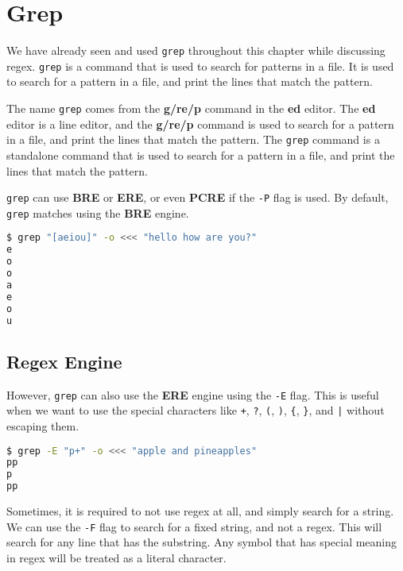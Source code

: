 \setchapterpreamble[u]{\margintoc}
\chapter{Grep}

We have already seen and used \lstinline|grep| throughout this chapter while discussing regex. \lstinline|grep| is a command that is used to search for patterns in a file. It is used to search for a pattern in a file, and print the lines that match the pattern.

The name \lstinline|grep| comes from the \textbf{g/re/p} command in the \textbf{ed} editor. The \textbf{ed} editor is a line editor, and the \textbf{g/re/p} command is used to search for a pattern in a file, and print the lines that match the pattern. The \lstinline|grep| command is a standalone command that is used to search for a pattern in a file, and print the lines that match the pattern.

\lstinline|grep| can use \textbf{BRE} or \textbf{ERE}, or even \textbf{PCRE} if the \lstinline|-P| flag is used. By default, \lstinline|grep| matches using the \textbf{BRE} engine.

\begin{lstlisting}[language=bash]
$ grep "[aeiou]" -o <<< "hello how are you?"
e
o
o
a
e
o
u
\end{lstlisting}

\section{Regex Engine}

However, \lstinline|grep| can also use the \textbf{ERE} engine using the \lstinline|-E| flag. This is useful when we want to use the special characters like \lstinline|+|, \lstinline|?|, \lstinline|(|, \lstinline|)|, \lstinline|{|, \lstinline|}|, and \lstinline:|: without escaping them.

\begin{lstlisting}[language=bash]
$ grep -E "p+" -o <<< "apple and pineapples"
pp
p
pp
\end{lstlisting}

Sometimes, it is required to not use regex at all, and simply search for a string. We can use the \lstinline|-F| flag to search for a fixed string, and not a regex.
This will search for any line that has the substring. Any symbol that has special meaning in regex will be treated as a literal character.


